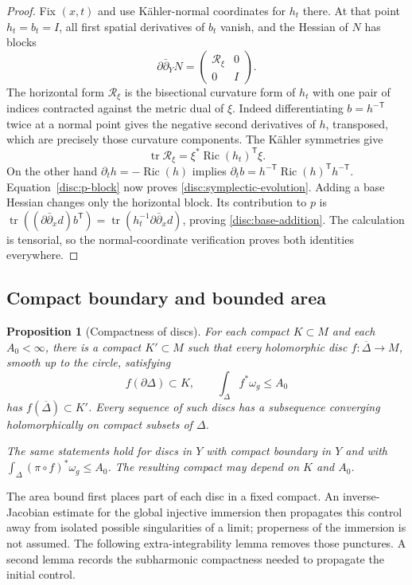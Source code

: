 \documentclass[11pt]{article}
\newtheorem{proposition}[theorem]{Proposition}
\theoremstyle{definition}
\theoremstyle{remark}
\newcommand{\dd}{\partial\bar\partial}
\DeclareMathOperator{\Ric}{Ric}
\DeclareMathOperator{\tr}{tr}
\numberwithin{equation}{section}
\begin{document}
\begin{proof}
Fix $(x,t)$ and use K\"ahler-normal coordinates for $h_t$ there.
At that point $h_t=b_t=I$, all first spatial derivatives of $b_t$
vanish, and the Hessian of $N$ has blocks
\[
 \dd_YN=\begin{pmatrix}\mathcal R_\xi&0\\0&I\end{pmatrix}.
\]
The horizontal form $\mathcal R_\xi$ is the bisectional curvature form
of $h_t$ with one pair of indices contracted against the metric dual
of $\xi$.  Indeed differentiating $b=h^{-\mathsf T}$ twice at a normal
point gives the negative second derivatives of $h$, transposed, which
are precisely those curvature components.  The K\"ahler symmetries give
\[
 \tr\mathcal R_\xi=\xi^*\Ric(h_t)^{\mathsf T}\xi.
\]
On the other hand $\partial_th=-\Ric(h)$ implies
$\partial_tb=h^{-\mathsf T}\Ric(h)^{\mathsf T}h^{-\mathsf T}$.
Equation~\eqref{disc:p-block} now proves
\eqref{disc:symplectic-evolution}.  Adding a base Hessian changes only
the horizontal block.  Its contribution to $p$ is
$\tr((\dd_xd)b^{\mathsf T})=\tr(h_t^{-1}\dd_xd)$, proving
\eqref{disc:base-addition}.  The calculation is tensorial, so the
normal-coordinate verification proves both identities everywhere.
\end{proof}

\subsection{Compact boundary and bounded area}

\begin{proposition}[Compactness of discs]\label{prop:disc-compactness}
For each compact $K\subset M$ and each $A_0<\infty$, there is a
compact $K'\subset M$ such that every holomorphic disc
$f:\overline\Delta\to M$, smooth up to the circle, satisfying
\[
 f(\partial\Delta)\subset K,\qquad
 \int_\Delta f^*\omega_g\le A_0
\]
has $f(\overline\Delta)\subset K'$.  Every sequence of such discs
has a subsequence converging holomorphically on compact subsets of
$\Delta$.

The same statements hold for discs in $Y$ with compact boundary in
$Y$ and with $\int_\Delta(\pi\circ f)^*\omega_g\le A_0$.
The resulting compact may depend on $K$ and $A_0$.
\end{proposition}

The area bound first places part of each disc in a fixed compact.
An inverse-Jacobian estimate for the global injective immersion then
propagates this control away from isolated possible singularities of a
limit; properness of the immersion is not assumed.  The following
extra-integrability lemma removes those punctures.  A second lemma
records the subharmonic compactness needed to propagate the initial
control.
\end{document}

